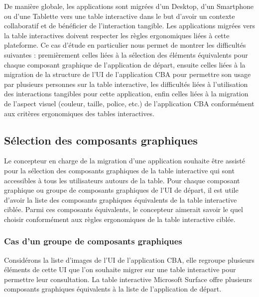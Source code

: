 De manière globale, les applications sont migrées d'un Desktop, d'un Smartphone ou d'une Tablette vers une table interactive dans le but d'avoir un contexte collaboratif
et de bénéficier de l'interaction tangible. Les applications migrées vers la table interactives
doivent respecter les règles ergonomiques liées à cette plateforme. Ce cas d'étude
en particulier nous permet de montrer les difficultés suivantes : premièrement celles liées à la sélection des éléments équivalents pour chaque composant graphique de l'application de départ, ensuite celles liées à la migration de la structure de l'UI de l'application
CBA pour permettre son usage par plusieurs personnes sur la table interactive,
les difficultés liées à l'utilisation des interactions tangibles pour cette application, enfin
celles liées à la migration de l'aspect visuel (couleur, taille, police, etc.) de l'application
CBA conformément aux critères ergonomiques des tables interactives.
{\raggedright
\subsection{Sélection des composants graphiques}
}

Le concepteur en charge de la migration d'une application souhaite être assisté pour la sélection des composants graphiques de la table interactive qui sont accessibles
à tous les utilisateurs autours de la table. Pour chaque composant graphique ou groupe de composants graphiques de l'UI de départ, il est utile d'avoir la liste des
composants graphiques équivalents de la table interactive ciblée. Parmi ces composants équivalents, le concepteur aimerait savoir le quel choisir conformément
aux règles ergonomiques de la table interactive ciblée.
{\raggedright
\subsubsection{Cas d'un groupe de composants graphiques}
}

Considérons la liste d'images de l'UI de l'application CBA, elle regroupe plusieurs éléments de cette UI que l'on souhaite migrer sur une table interactive pour permettre leur consultation. La table interactive Microsoft Surface offre plusieurs composants graphiques équivalents à la liste de l'application de départ.

